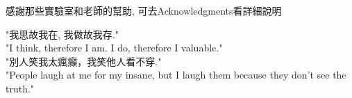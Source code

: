 
感謝那些實驗室和老師的幫助, 可去Acknowledgments{}看詳細說明

"我思故我在, 我做故我存."\\
"I think, therefore I am. I do, therefore I valuable."\\

"別人笑我太瘋癲，我笑他人看不穿."\\
"People laugh at me for my insane, but I laugh them because they don't see the truth."\\

\EndAcknowledgments
